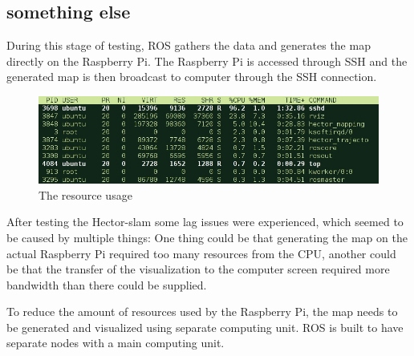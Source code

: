 \subsection{something else}
During this stage of testing, ROS gathers the data and generates the map directly on the Raspberry Pi. The Raspberry Pi is accessed through SSH and the generated map is then broadcast to computer through the SSH connection.

\begin{figure}[H]
	\centering
	\includegraphics[width=.8\linewidth]{images/rvisScreenshotCropped.jpg}
	\caption{The resource usage}
\end{figure}


After testing the Hector-slam some lag issues were experienced, which seemed to be caused by multiple things: One thing could be that generating the map on the actual Raspberry Pi required too many resources from the CPU, another could be that the transfer of the visualization to the computer screen required more bandwidth than there could be supplied.

To reduce the amount of resources used by the Raspberry Pi, the map needs to be generated and visualized using separate computing unit. ROS is built to have separate nodes with a main computing unit.


